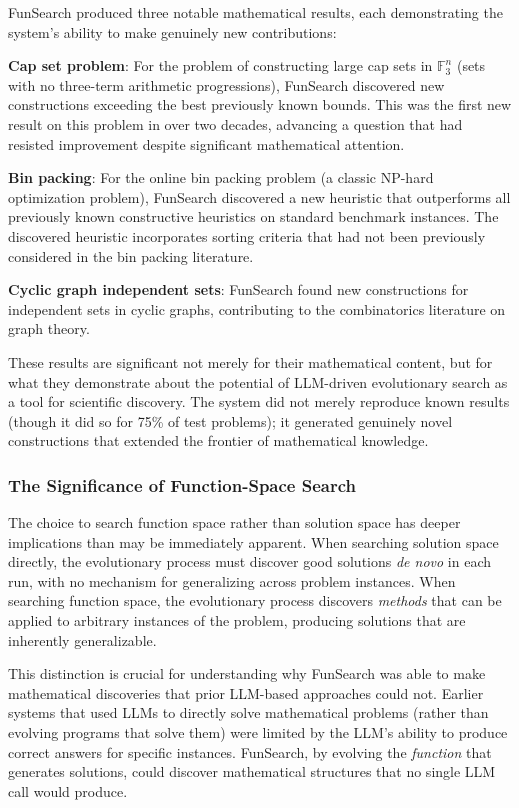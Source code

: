 FunSearch produced three notable mathematical results, each demonstrating the system's ability to make genuinely new contributions:

\textbf{Cap set problem}: For the problem of constructing large cap sets in $\mathbb{F}_3^n$ (sets with no three-term arithmetic progressions), FunSearch discovered new constructions exceeding the best previously known bounds. This was the first new result on this problem in over two decades, advancing a question that had resisted improvement despite significant mathematical attention.

\textbf{Bin packing}: For the online bin packing problem (a classic NP-hard optimization problem), FunSearch discovered a new heuristic that outperforms all previously known constructive heuristics on standard benchmark instances. The discovered heuristic incorporates sorting criteria that had not been previously considered in the bin packing literature.

\textbf{Cyclic graph independent sets}: FunSearch found new constructions for independent sets in cyclic graphs, contributing to the combinatorics literature on graph theory.

These results are significant not merely for their mathematical content, but for what they demonstrate about the potential of LLM-driven evolutionary search as a tool for scientific discovery. The system did not merely reproduce known results (though it did so for 75\% of test problems); it generated genuinely novel constructions that extended the frontier of mathematical knowledge.

\subsubsection{The Significance of Function-Space Search}

The choice to search function space rather than solution space has deeper implications than may be immediately apparent. When searching solution space directly, the evolutionary process must discover good solutions \emph{de novo} in each run, with no mechanism for generalizing across problem instances. When searching function space, the evolutionary process discovers \emph{methods} that can be applied to arbitrary instances of the problem, producing solutions that are inherently generalizable.

This distinction is crucial for understanding why FunSearch was able to make mathematical discoveries that prior LLM-based approaches could not. Earlier systems that used LLMs to directly solve mathematical problems (rather than evolving programs that solve them) were limited by the LLM's ability to produce correct answers for specific instances. FunSearch, by evolving the \emph{function} that generates solutions, could discover mathematical structures that no single LLM call would produce.

